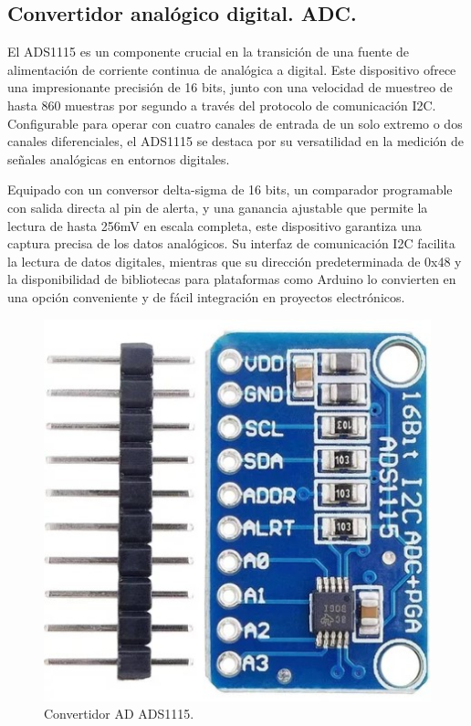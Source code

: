 \subsection{Convertidor analógico digital. ADC.}
El ADS1115 \cite{ADS1115} es un componente crucial en la transición de una fuente de alimentación de corriente continua de analógica a digital. Este dispositivo ofrece una impresionante precisión de 16 bits, junto con una velocidad de muestreo de hasta 860 muestras por segundo a través del protocolo de comunicación I2C. Configurable para operar con cuatro canales de entrada de un solo extremo o dos canales diferenciales, el ADS1115 se destaca por su versatilidad en la medición de señales analógicas en entornos digitales. \par 
Equipado con un conversor delta-sigma de 16 bits, un comparador programable con salida directa al pin de alerta, y una ganancia ajustable que permite la lectura de hasta 256mV en escala completa, este dispositivo garantiza una captura precisa de los datos analógicos. Su interfaz de comunicación I2C facilita la lectura de datos digitales, mientras que su dirección predeterminada de 0x48 y la disponibilidad de bibliotecas para plataformas como Arduino lo convierten en una opción conveniente y de fácil integración en proyectos electrónicos.\par 
\begin{figure}[H]
    \centering
    \includegraphics[scale=0.3]{./imagenes/ads1115.jpg}
    \caption{Convertidor AD ADS1115.}
    \label{F:ADC}
\end{figure}

